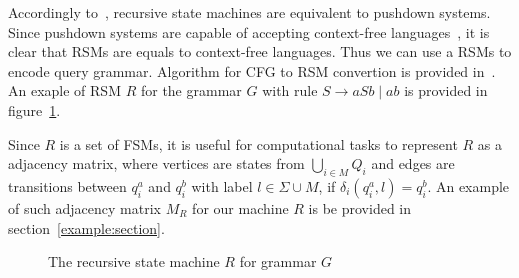 Accordingly to~\cite{rsm:analysis:10.1007/3-540-44585-4_18}, recursive state machines are equivalent to pushdown systems. Since pushdown systems are capable of accepting context-free languages~\cite{automata:theory:10.5555/1177300}, it is clear that RSMs are equals to context-free languages.
Thus we can use a RSMs to encode query grammar. 
Algorithm for CFG to RSM convertion is provided in~\cite{!!!}.
An exaple of RSM $R$ for the grammar $G$ with rule $S \to a S b \mid a b$ is provided in figure~\ref{example:automata}.


Since $R$ is a set of FSMs, it is useful for computational tasks to represent $R$ as a adjacency matrix, where vertices are states from $\bigcup_{i \in M}Q_i$ and edges are transitions between $q_i^a$ and $q_i^b$ with label $l \in \Sigma \cup M$, if $\delta_i (q_i^a, l) = q_i^b$. An example of such adjacency matrix $M_R$ for our machine $R$ is be provided in section~\ref{example:section}.


\begin{figure}[h]
    \centering
    \caption{The recursive state machine $R$ for grammar $G$}
    \label{example:automata}
\end{figure}

